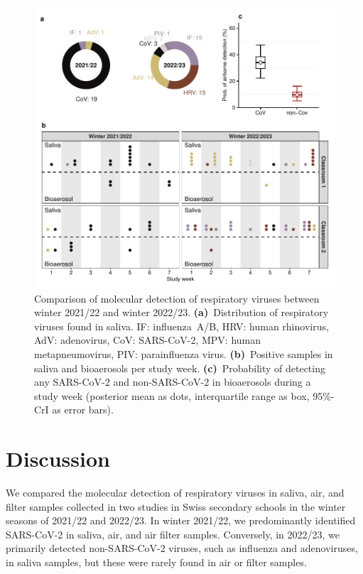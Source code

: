 \documentclass[fleqn,11pt]{wlscirep}
\begin{document}
\begin{figure}
    \centering
    \includegraphics{results/comparison.pdf}
    \caption{Comparison of molecular detection of respiratory viruses between winter 2021/22 and winter 2022/23. \textbf{(a)}~Distribution of respiratory viruses found in saliva. IF: influenza~A/B, HRV: human rhinovirus, AdV: adenovirus, CoV: SARS-CoV-2, MPV: human metapneumovirus, PIV: parainfluenza virus. \textbf{(b)}~Positive samples in saliva and bioaerosols per study week. \textbf{(c)}~Probability of detecting any SARS-CoV-2 and non-SARS-CoV-2 in bioaerosols during a study week (posterior mean as dots, interquartile range as box, 95\%-CrI as error bars).}
    \label{fig:comparison}
\end{figure}


\section*{Discussion}


We compared the molecular detection of respiratory viruses in saliva, air, and filter samples collected in two studies in Swiss secondary schools in the winter seasons of 2021/22 and 2022/23. In winter 2021/22, we predominantly identified SARS-CoV-2 in saliva, air, and air filter samples. Conversely, in 2022/23, we primarily detected non-SARS-CoV-2 viruses, such as influenza and adenoviruses, in saliva samples, but these were rarely found in air or filter samples. 
\end{document}
